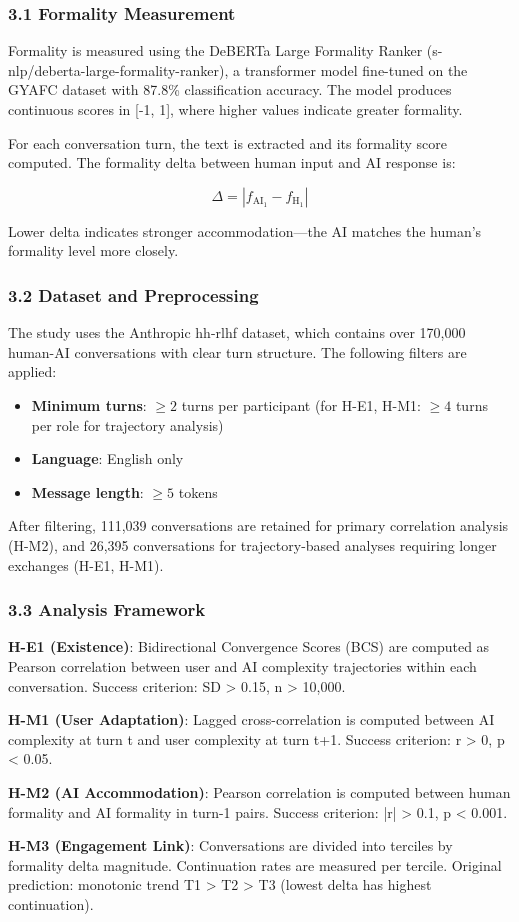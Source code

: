 
\subsubsection{3.1 Formality Measurement}

Formality is measured using the DeBERTa Large Formality Ranker (s-nlp/deberta-large-formality-ranker), a transformer model fine-tuned on the GYAFC dataset with 87.8\% classification accuracy. The model produces continuous scores in [-1, 1], where higher values indicate greater formality.

For each conversation turn, the text is extracted and its formality score computed. The formality delta between human input and AI response is:

$$\Delta = |f_{\text{AI}_1} - f_{\text{H}_1}|$$

Lower delta indicates stronger accommodation---the AI matches the human's formality level more closely.

\subsubsection{3.2 Dataset and Preprocessing}

The study uses the Anthropic hh-rlhf dataset, which contains over 170,000 human-AI conversations with clear turn structure. The following filters are applied:

\begin{itemize}
\item \textbf{Minimum turns}: $\geq 2$ turns per participant (for H-E1, H-M1: $\geq 4$ turns per role for trajectory analysis)
\item \textbf{Language}: English only
\item \textbf{Message length}: $\geq 5$ tokens
\end{itemize}

After filtering, 111,039 conversations are retained for primary correlation analysis (H-M2), and 26,395 conversations for trajectory-based analyses requiring longer exchanges (H-E1, H-M1).

\subsubsection{3.3 Analysis Framework}

\textbf{H-E1 (Existence)}: Bidirectional Convergence Scores (BCS) are computed as Pearson correlation between user and AI complexity trajectories within each conversation. Success criterion: SD > 0.15, n > 10,000.

\textbf{H-M1 (User Adaptation)}: Lagged cross-correlation is computed between AI complexity at turn t and user complexity at turn t+1. Success criterion: r > 0, p < 0.05.

\textbf{H-M2 (AI Accommodation)}: Pearson correlation is computed between human formality and AI formality in turn-1 pairs. Success criterion: |r| > 0.1, p < 0.001.

\textbf{H-M3 (Engagement Link)}: Conversations are divided into terciles by formality delta magnitude. Continuation rates are measured per tercile. Original prediction: monotonic trend T1 > T2 > T3 (lowest delta has highest continuation).

